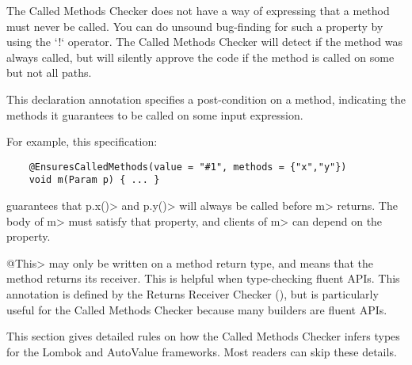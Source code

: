 \begin{description}
  The Called Methods Checker does not have a way of expressing that a
  method must never be called.  You can do unsound bug-finding for such a
  property by using the `!` operator.  The Called Methods Checker will
  detect if the method was always called, but will silently approve the code
  if the method is called on some but not all paths.

\item[\refqualclass{checker/CalledMethods/qual}{EnsuresCalledMethods}]
  This declaration annotation specifies a post-condition on a method, indicating the methods it
  guarantees to be called on some input expression.

  For example, this specification:

  \begin{Verbatim}
    @EnsuresCalledMethods(value = "#1", methods = {"x","y"})
    void m(Param p) { ... }
  \end{Verbatim}

  guarantees that \<p.x()> and \<p.y()> will always be called before \<m> returns.
  The body of \<m> must satisfy that property, and clients of \<m> can depend on the property.

\item[\refqualclass{common/returnsreceiver/qual}{This}]
  \<@This> may only be written on a method return type, and means that the method returns its receiver.
  This is helpful when type-checking fluent APIs. This annotation is defined by the
  Returns Receiver Checker (), but is particularly useful
  for the Called Methods Checker because many builders are fluent APIs.

\end{description}


This section gives detailed rules on how the Called Methods Checker infers types for the Lombok
and AutoValue frameworks. Most readers can skip these details.

